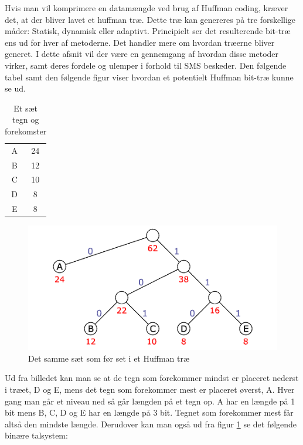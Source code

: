 Hvis man vil komprimere en datamængde ved brug af Huffman coding, kræver det, at der bliver lavet et huffman træ. Dette træ kan genereres på tre forskellige måder: Statisk, dynamisk eller adaptivt. Principielt ser det resulterende bit-træ ens ud for hver af metoderne. Det handler mere om hvordan træerne bliver generet. I dette afsnit vil der være en gennemgang af hvordan disse metoder virker, samt deres fordele og ulemper i forhold til SMS beskeder. Den følgende tabel samt den følgende figur viser hvordan et potentielt Huffman bit-træ kunne se ud.

\begin{table}[H]
\begin{center}
\begin{tabular}{|c|c|}
\hline
\cellcolor{ForestGreen}\color{white}{\textbf{Tegn}}& \cellcolor{ForestGreen}\color{white}{\textbf{Forekomster}}\\[2ex] \hline
A & 24 \\ \hline
B & 12 \\ \hline
C & 10 \\ \hline
D & 8 \\ \hline
E & 8 \\ \hline
\end{tabular} 
\caption{Et sæt tegn og forekomster}
\end{center}
\end{table}

\begin{figure}[H]
\centering
\includegraphics[width=\linewidth]{Billeder/huffman_tree.png}
\caption{Det samme sæt som før set i et Huffman træ \cite{Hufftree_1}}
\label{fig:huffmantree_fred}
\end{figure}

Ud fra billedet kan man se at de tegn som forekommer mindst er placeret nederst i træet, D og E, mens det tegn som forekommer mest er placeret øverst, A. Hver gang man går et niveau ned så går længden på et tegn op. A har en længde på 1 bit mens B, C, D og E har en længde på 3 bit. Tegnet som forekommer mest får altså den mindste længde. Derudover kan man også ud fra figur \ref{fig:huffmantree_fred} se det følgende binære talsystem:


